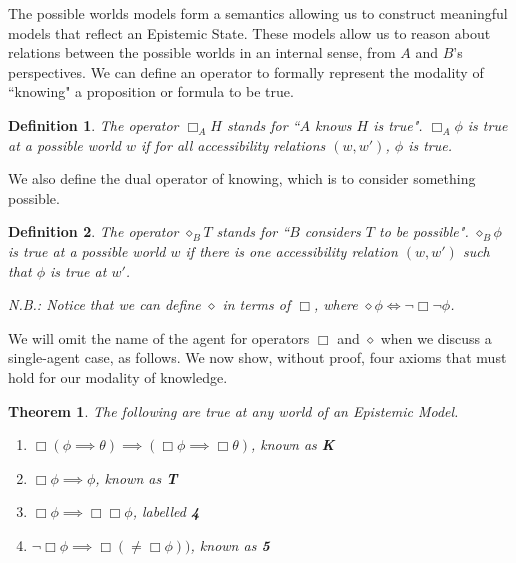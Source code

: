 \documentclass[12pt, a4paper, titlepage]{scrartcl}
\newtheorem{defn}{Definition}
\newtheorem{thm}{Theorem}
\begin{document}
The possible worlds models form a semantics allowing us to construct meaningful
models that reflect an Epistemic State.
These models allow us to reason about relations between the possible worlds in
an internal sense, from $A$ and $B$'s perspectives. \citep{blackburn2002modal}
We can define an operator to formally represent the modality of ``knowing"
a proposition or formula to be true.
\begin{defn}
	The operator $\Box_A H$ stands for ``$A$ knows $H$ is true".
	$\Box_A \phi$ is true at a possible world $w$ if for all accessibility relations $(w,
	w')$, $\phi$ is true.
\end{defn}
We also define the dual operator of knowing, which is to consider something
possible.
\begin{defn}
	The operator $\diamond_B T$ stands for ``$B$ considers $T$ to be possible".
	$\diamond_B \phi$ is true at a possible world $w$ if there is one
	accessibility relation $(w,w')$ such that $\phi$ is true at $w'$.\\
	
	\begin{note}
		N.B.: Notice that we can define $\diamond$ in terms of $\Box$, where $\diamond
		\phi \iff \neg \Box \neg \phi$.
	\end{note}
\end{defn}
We will omit the name of the agent for operators $\Box$ and $\diamond$ when we
discuss a single-agent case, as follows.
We now show, without proof, four axioms that must hold for our modality of
knowledge.
\begin{thm}
	The following are true at any world of an Epistemic Model.
	\begin{enumerate}
		\item $\Box (\phi \implies \theta) \implies (\Box \phi \implies \Box
				\theta)$, known as {\bf K}
		\item $\Box \phi \implies \phi$, known as {\bf T}
		\item $\Box \phi \implies \Box \Box \phi$, labelled {\bf 4}
		\item $\neg \Box \phi \implies \Box (\neq \Box \phi))$, known as {\bf 5}
	\end{enumerate}
	\citep{hoek2008dynamic}
\end{thm}
\end{document}
